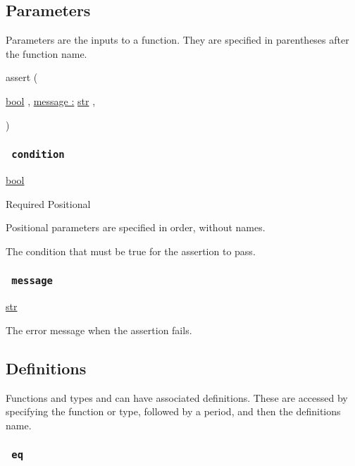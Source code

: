 \subsection{\texorpdfstring{{ Parameters
}}{ Parameters }}\label{parameters}

\label{parameters-tooltip}
Parameters are the inputs to a function. They are specified in
parentheses after the function name.

{ assert } (

{ \href{/docs/reference/foundations/bool/}{bool} , } {
\hyperref[parameters-message]{message :}
\href{/docs/reference/foundations/str/}{str} , }

)

\subsubsection{\texorpdfstring{\texttt{\ condition\ }}{ condition }}\label{parameters-condition}

\href{/docs/reference/foundations/bool/}{bool}

{Required} {{ Positional }}

\label{parameters-condition-positional-tooltip}
Positional parameters are specified in order, without names.

The condition that must be true for the assertion to pass.

\subsubsection{\texorpdfstring{\texttt{\ message\ }}{ message }}\label{parameters-message}

\href{/docs/reference/foundations/str/}{str}

The error message when the assertion fails.

\subsection{\texorpdfstring{{ Definitions
}}{ Definitions }}\label{definitions}

\label{definitions-tooltip}
Functions and types and can have associated definitions. These are
accessed by specifying the function or type, followed by a period, and
then the definition\textquotesingle s name.

\subsubsection{\texorpdfstring{\texttt{\ eq\ }}{ eq }}\label{definitions-eq}

